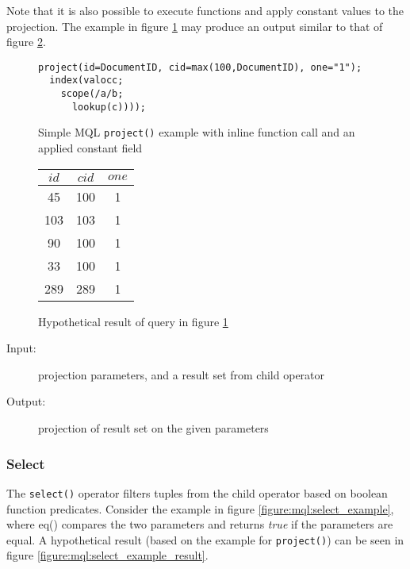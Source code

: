 Note that it is also possible to execute functions and apply constant values to
the projection. The example in figure \ref{figure:mql:project_example2} may
produce an output similar to that of figure
\ref{figure:mql:project_example2_result}.

\begin{figure}[!h]
\centering
\begin{Verbatim}
project(id=DocumentID, cid=max(100,DocumentID), one="1");
  index(valocc;
    scope(/a/b;
      lookup(c))));
\end{Verbatim}
\caption{Simple MQL \texttt{project()} example with inline function call 
and an applied constant field}
\label{figure:mql:project_example2}
\end{figure}

\begin{figure}[!h]
\centering
\begin{tabular}{|c | c | c |}
\hline
$id$ & $cid$ & $one$ \\ \hline
45 & 100 & 1 \\ \hline
103 & 103 & 1 \\ \hline
90 & 100 & 1 \\ \hline
33 & 100 & 1 \\ \hline
289 & 289 & 1 \\ \hline
\end{tabular}
\caption{Hypothetical result of query in figure
\ref{figure:mql:project_example2}}
\label{figure:mql:project_example2_result}
\end{figure}

\begin{description}
  \item[Input:] projection parameters, and a result set from child operator
  \item[Output:] projection of result set on the given parameters
\end{description}

\subsubsection{Select}
The \texttt{select()} operator filters tuples from the child operator based on
boolean function predicates. Consider the example in figure
\ref{figure:mql:select_example}, where eq() compares the two parameters and
returns \textit{true} if the parameters are equal. A hypothetical result (based
on the example for \texttt{project()}) can be seen in figure
\ref{figure:mql:select_example_result}.

